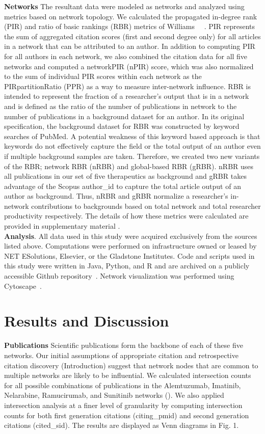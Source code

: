 \documentclass[10pt,letterpaper]{article}
\begin{document}
\textbf{Networks} The resultant data were modeled as networks and analyzed using metrics based on network topology. We calculated the propagated in-degree rank (PIR) and ratio of basic rankings (RBR) metrics of Williams ~~\cite{bibWilliams}. PIR represents the sum of aggregated citation scores (first and second degree only)  for all articles in a network that can be attributed to an author. In addition to computing PIR for all authors in each network, we also combined the citation data for all five networks and computed a networkPIR (nPIR) score, which was also normalized to the sum of individual PIR scores within each network as the PIRpartitionRatio (PPR) as a way to measure inter-network influence. RBR is intended to represent the fraction of a researcher's output that is in a network and is defined as the ratio of the number of publications in network to the number of publications in a background dataset for an author. In its original specification, the background dataset for RBR was constructed by keyword searches of PubMed. A potential weakness of this keyword based approach is that keywords do not effectively capture the field or the total output of an author even if multiple background samples are taken. Therefore, we created two new variants of the RBR; network RBR (nRBR) and global-based RBR (gRBR). nRBR uses all publications in our set of five therapeutics as background and gRBR takes advantage of the Scopus author\_id to capture the total article output of an author as background. Thus, nRBR and gRBR normalize a researcher's in-network contributions to backgrounds based on total network and total researcher productivity respectively. The details of how these metrics were calculated are provided in supplementary material .\\

\textbf{Analysis}. All data used in this study were acquired exclusively from the sources listed above. Computations were performed on infrastructure owned or leased by NET ESolutions, Elsevier, or the Gladstone Institutes. Code and scripts used in this study were written in Java, Python, and R and are archived on a publicly accessible Github repository~\cite{bibGithub}.  Network visualization was performed using Cytoscape~\cite{bibCytoscape}.

\section*{Results and Discussion} 
\textbf{Publications} Scientific publications form the backbone of each of these five networks. Our initial assumptions of appropriate citation and retrospective citation discovery (Introduction) suggest that network nodes that are common to multiple networks are likely to be influential. We calculated intersection counts for all possible combinations of publications in the Alemtuzumab, Imatinib, Nelarabine, Ramucirumab, and Sunitinib networks (). We also applied intersection analysis at a finer level of granularity by computing intersection counts for both first generation citations (citing\_pmid) and second generation citations (cited\_sid). The results are displayed as Venn diagrams in Fig. 1. 
\end{document}

